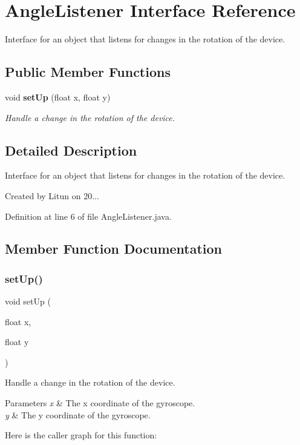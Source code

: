 \section{Angle\+Listener Interface Reference}
\label{interfaceru_1_1litun_1_1unitingtwist_1_1_angle_listener}


Interface for an object that listens for changes in the rotation of the device.  


\subsection*{Public Member Functions}
\begin{DoxyCompactItemize}
\item 
void \textbf{ set\+Up} (float x, float y)
\begin{DoxyCompactList}\small\item\em Handle a change in the rotation of the device. \end{DoxyCompactList}\end{DoxyCompactItemize}


\subsection{Detailed Description}
Interface for an object that listens for changes in the rotation of the device. 

Created by Litun on 20... 

Definition at line 6 of file Angle\+Listener.\+java.



\subsection{Member Function Documentation}
\mbox{\label{interfaceru_1_1litun_1_1unitingtwist_1_1_angle_listener_a2e4912428e9969f71dff31060f2debf5}} 
\subsubsection{set\+Up()}
{\footnotesize\ttfamily void set\+Up (\begin{DoxyParamCaption}\item[{float}]{x,  }\item[{float}]{y }\end{DoxyParamCaption})}



Handle a change in the rotation of the device. 


\begin{DoxyParams}{Parameters}
{\em x} & The x coordinate of the gyroscope. \\
\hline
{\em y} & The y coordinate of the gyroscope. \\
\hline
\end{DoxyParams}
Here is the caller graph for this function\+:
